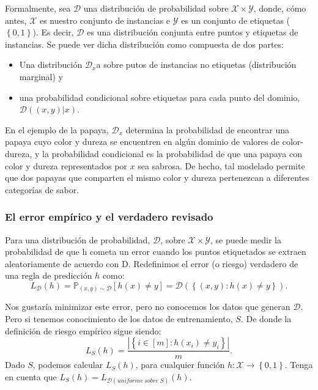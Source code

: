 Formalmente, sea $\mathcal{D}$ una distribución de probabilidad sobre $\mathcal{X}\times \mathcal{Y}$, donde, cómo antes, $\mathcal{X}$ es nuestro conjunto de instancias e $\mathcal{Y}$ es un conjunto de etiquetas ($\left\{0,1\right\}$). Es decir, $\mathcal{D}$ es una distribución conjunta entre puntos y etiquetas de instancias. Se puede ver dicha distribución como compuesta de dos partes:
\begin{itemize}
    \item Una distribución $\mathcal{D}_x$a sobre putos de instancias no etiquetas (distribución marginal) y
    \item una probabilidad condicional sobre etiquetas para cada punto del dominio, $\mathcal{D}\left((x,y)|x\right)$.
\end{itemize}

En el ejemplo de la papaya, $\mathcal{D}_x$ determina la probabilidad de encontrar una papaya cuyo color y dureza se encuentren en algún dominio de valores de color-dureza, y la probabilidad condicional es la probabilidad de que una papaya con color y dureza representados por $x$ sea sabrosa. De hecho, tal modelado permite que dos papayas que comparten el mismo color y dureza pertenezcan a diferentes categorías de sabor.

\subsubsection{El error empírico y el verdadero revisado}
Para una distribución de probabilidad, $\mathcal{D}$, sobre $\mathcal{X} \times \mathcal{Y}$, se puede medir la probabilidad de que h cometa un error cuando los puntos etiquetados se extraen aleatoriamente de acuerdo con D. Redefinimos el error (o riesgo) verdadero de una regla de predicción $h$ como:
\begin{equation}
    L_{\mathcal{D}}(h) = \mathbb{P}_{(x,y)\sim \mathcal{D}}\left[h(x)\neq y\right]=\mathcal{D}\left(\left\{\left(x,y\right):h(x)\neq y\right\}\right).
\end{equation}

Nos gustaría minimizar este error, pero no conocemos los datos que generan $\mathcal{D}$. Pero si tenemos conocimiento de los datos de entrenamiento, $S$. De donde la definición de riesgo empírico sigue siendo:
$$L_S(h) = \dfrac{|\left\{i\in [m]:h(x_i)\neq y_i\right\}|}{m}.$$
Dado $S$, podemos calcular $L_S(h)$, para cualquier función $h: \mathcal{X} \to \left\{0,1\right\}$. Tenga en cuenta que $L_S(h)=L_{\mathcal{D} (uniforme\; sobre\; S)}(h)$.

